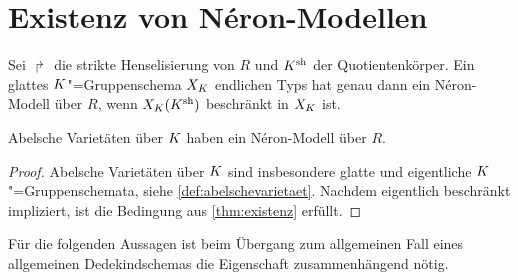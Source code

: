 \documentclass[german]{scrreprt}
\begin{document}





\section{Existenz von Néron-Modellen}

\begin{Satz}\label{thm:existenz}
  Sei $\Rsh$ die strikte Henselisierung von $R$ und $K^{\text{sh}}$ der
  Quotientenkörper. Ein glattes $K$"=Gruppenschema $X_{K}$ endlichen
  Typs hat genau dann ein Néron-Modell über $R$, wenn $X_{K}(K^{\text{sh}})$
  beschränkt in $X_{K}$ ist.
  \cite[1.3, Theorem 1]{neron}
\end{Satz}
\begin{Korollar}\label{thm:exneronmodellabvarietaet}
  Abelsche Varietäten über $K$ haben ein Néron-Modell über $R$.
  \begin{proof}
    Abelsche Varietäten über $K$ sind insbesondere glatte und
    eigentliche $K$"=Gruppenschemata, siehe
    \autoref{def:abelschevarietaet}.
    Nachdem eigentlich beschränkt impliziert, ist die Bedingung aus
    \autoref{thm:existenz} erfüllt.
  \end{proof}
\end{Korollar}

Für die folgenden Aussagen ist beim Übergang zum allgemeinen Fall
eines allgemeinen Dedekindschemas die Eigenschaft zusammenhängend
nötig.
\end{document}
